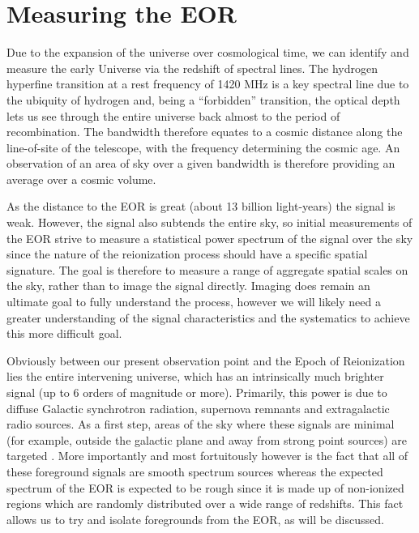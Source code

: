 \documentclass[preprint,11pt]{aastex}
\begin{document}
\section{Measuring the EOR}
\label{sec:eormeas}
Due to the expansion of the universe over cosmological time, we can identify and measure the early Universe via the redshift of spectral lines.  The hydrogen hyperfine transition at a rest frequency of 1420 MHz is a key spectral line due to the ubiquity of hydrogen and, being a ``forbidden'' transition, the optical depth lets us see through the entire universe back almost to the period of recombination.  The bandwidth
therefore equates to a cosmic distance along the line-of-site of the telescope, with the frequency determining the cosmic age.  An observation of an area of sky over a given bandwidth is therefore providing an average
over a cosmic volume.

As the distance to the EOR is great (about 13 billion light-years) the signal is weak.  However, the signal also subtends the entire sky, so initial measurements of the EOR strive to measure a statistical power spectrum of the signal over the sky since the nature of the reionization process should have a specific spatial signature.  The goal is therefore to measure a range of aggregate spatial scales on the sky, rather than to image the signal directly.  Imaging does remain an ultimate goal to fully understand the process, however we will likely need a greater understanding of the signal characteristics and the systematics to achieve this more difficult goal.  

Obviously between our present observation point and the Epoch of Reionization lies the entire intervening universe, which has an intrinsically much brighter signal (up to 6 orders of magnitude or more).  Primarily, this power is due to diffuse Galactic synchrotron radiation, supernova remnants and extragalactic radio sources.  As a first step, areas of the sky where these signals are minimal (for example, outside the galactic plane and away from strong point sources) are targeted \citep{bernardi_2013}.  More importantly and most fortuitously however is the fact that all of these foreground signals are smooth spectrum sources whereas the expected spectrum of the EOR is expected to be rough since it is made up of non-ionized regions which are randomly distributed over a wide range of redshifts.  This fact allows us to try and isolate foregrounds from the EOR, as will be discussed.
\end{document}
